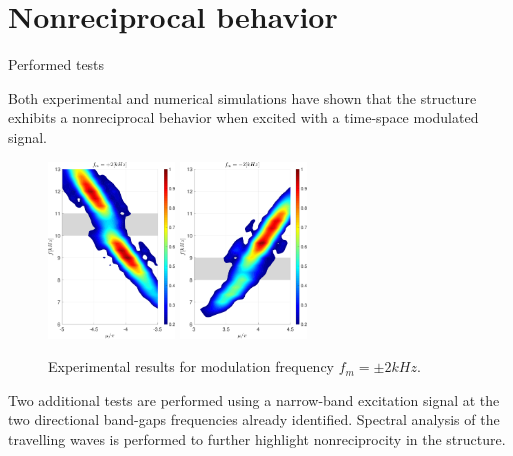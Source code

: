 \section{Nonreciprocal behavior}

\begin{frame}{Performed tests}

    Both experimental and numerical simulations have shown that the structure exhibits a nonreciprocal behavior when excited with a time-space modulated signal.

    \begin{figure}[H]
        \centering
        \includegraphics[width=0.3\textwidth]{img/MATLAB/EXP_nonreciprocal_@+2kHz.pdf}
        \hspace{1cm}
        \includegraphics[width=0.3\textwidth]{img/MATLAB/EXP_nonreciprocal_@-2kHz.pdf}
        \caption{Experimental results for modulation frequency $f_m = \pm 2 kHz$.}
    \end{figure}

    Two additional tests are performed using a narrow-band excitation signal at the two directional band-gaps frequencies already identified.
    Spectral analysis of the travelling waves is performed to further highlight nonreciprocity in the structure.

\end{frame}



